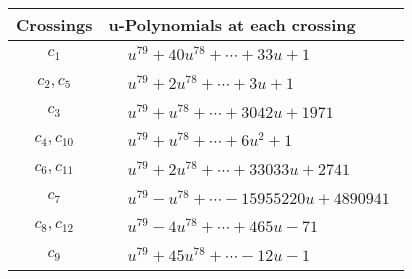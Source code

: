 \documentclass[1p]{elsarticle_modified}
\theoremstyle{definition}
\begin{document}
\begin{tabular}{m{50pt}|m{274pt}}
Crossings & \hspace{64pt}u-Polynomials at each crossing \\
\hline $$\begin{aligned}c_{1}\end{aligned}$$&$\begin{aligned}
&u^{79}+40 u^{78}+\cdots+33 u+1
\end{aligned}$\\
\hline $$\begin{aligned}c_{2},c_{5}\end{aligned}$$&$\begin{aligned}
&u^{79}+2 u^{78}+\cdots+3 u+1
\end{aligned}$\\
\hline $$\begin{aligned}c_{3}\end{aligned}$$&$\begin{aligned}
&u^{79}+u^{78}+\cdots+3042 u+1971
\end{aligned}$\\
\hline $$\begin{aligned}c_{4},c_{10}\end{aligned}$$&$\begin{aligned}
&u^{79}+u^{78}+\cdots+6 u^2+1
\end{aligned}$\\
\hline $$\begin{aligned}c_{6},c_{11}\end{aligned}$$&$\begin{aligned}
&u^{79}+2 u^{78}+\cdots+33033 u+2741
\end{aligned}$\\
\hline $$\begin{aligned}c_{7}\end{aligned}$$&$\begin{aligned}
&u^{79}- u^{78}+\cdots-15955220 u+4890941
\end{aligned}$\\
\hline $$\begin{aligned}c_{8},c_{12}\end{aligned}$$&$\begin{aligned}
&u^{79}-4 u^{78}+\cdots+465 u-71
\end{aligned}$\\
\hline $$\begin{aligned}c_{9}\end{aligned}$$&$\begin{aligned}
&u^{79}+45 u^{78}+\cdots-12 u-1
\end{aligned}$\\
\hline
\end{tabular}\\~\\
\end{document}
